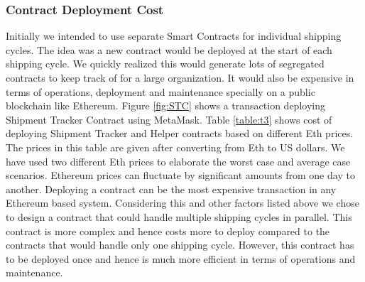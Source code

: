 \subsubsection{Contract Deployment Cost}
Initially we intended to use separate Smart Contracts for individual shipping cycles. The idea was a new contract would be deployed at the start of each shipping cycle. We quickly realized this would generate lots of segregated contracts to keep track of for a large organization. It would also be expensive in terms of operations, deployment and maintenance specially on a public blockchain like Ethereum. Figure \ref{fig:STC} shows a transaction deploying Shipment Tracker Contract using MetaMask. Table \ref{table:t3} shows cost of deploying Shipment Tracker and Helper contracts based on different Eth prices. The prices in this table are given after converting from Eth to US dollars. We have used two different Eth prices to elaborate the worst case and average case scenarios. Ethereum prices can fluctuate by significant amounts from one day to another. Deploying a contract can be the most expensive transaction in any Ethereum based system. Considering this and other factors listed above we chose to design a contract that could handle multiple shipping cycles in parallel. This contract is more complex and hence costs more to deploy compared to the contracts that would handle only one shipping cycle. However, this contract has to be deployed once and hence is much more efficient in terms of operations and maintenance.
